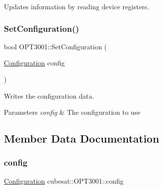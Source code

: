 Updates information by reading device registers. 

\mbox{\label{classcubesat_1_1OPT3001_a6df0cf4e46e38bbe9909f8e905b7540e}} 
\subsubsection{\texorpdfstring{Set\+Configuration()}{SetConfiguration()}}
{\footnotesize\ttfamily bool O\+P\+T3001\+::\+Set\+Configuration (\begin{DoxyParamCaption}\item[{\hyperlink{unioncubesat_1_1OPT3001_1_1Configuration}{Configuration}}]{config }\end{DoxyParamCaption})}



Writes the configuration data. 


\begin{DoxyParams}{Parameters}
{\em config} & The configuration to use \\
\hline
\end{DoxyParams}


\subsection{Member Data Documentation}
\mbox{\label{classcubesat_1_1OPT3001_acf76526638ac9210adb947fa6b4b155f}} 
\subsubsection{\texorpdfstring{config}{config}}
{\footnotesize\ttfamily \hyperlink{unioncubesat_1_1OPT3001_1_1Configuration}{Configuration} cubesat\+::\+O\+P\+T3001\+::config\hspace{0.3cm}{\ttfamily [private]}}

\mbox{\label{classcubesat_1_1OPT3001_ab7240590fe1e63a4b4884ccdd603c243}} 
